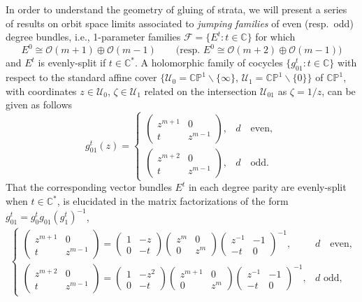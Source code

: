 \documentclass[pdftex]{sigma}
\newcommand{\field}[1]{\ensuremath{\mathbb{#1}}}
\newcommand{\CC}{\field{C}}
\newcommand{\PP}{\field{P}}
\newcommand{\calO}{\mathcal{O}}
\newcommand{\curly}[1]{\mathscr{#1}}
\newcommand{\cF}{\curly{F}}
\newcommand{\cU}{\curly{U}}
\numberwithin{equation}{section}
\begin{document}
In order to understand the geometry of gluing of strata, we will present a series of results on orbit space limits associated to \textit{jumping families} of even (resp.~odd) degree bundles, i.e., 1-parameter families $\cF = \{E^{t}\colon t\in\CC\}$ for which
\[
E^{0}\cong \calO(m+1)\oplus\calO(m-1)\qquad \big(\text{resp. } E^{0}\cong \calO(m+2)\oplus\calO(m-1)\big)
\]
and $E^{t}$ is evenly-split if $t\in\CC^{*}$. A holomorphic family of cocycles $\{g_{01}^{t}\colon t\in\CC\}$ with respect to the standard affine cover $\{\cU_{0}= \CC\PP^{1}\backslash\{\infty\}$, $\cU_{1}= \CC\PP^{1}\backslash\{0\}\}$ of $\CC\PP^{1}$, with coordinates $z\in\cU_{0}$, $\zeta\in\cU_{1}$ related on the intersection $\cU_{01}$ as $\zeta = 1/z$, can be given as follows
\[
g^{t}_{01}(z) = \begin{cases}
\begin{pmatrix}
z^{m+1} & 0\\
t & z^{m-1}
\end{pmatrix}\!, & d\quad \text{even},
\\[3ex]
\begin{pmatrix}
z^{m+2} & 0\\
t & z^{m-1}
\end{pmatrix}\!, & d\quad \text{odd}.
\end{cases}
\]
That the corresponding vector bundles $E^{t}$ in each degree parity are evenly-split when $t\in\CC^{*}$, is elucidated in the matrix factorizations of the form $g^{t}_{01} = g^{t}_{0}g_{01}(g^{t}_{1})^{-1}$,
\begin{gather}\label{eq:cocycle}
 \begin{cases}
\begin{pmatrix}
z^{m+1} & 0\\
t & z^{m-1}
\end{pmatrix} =
\begin{pmatrix}
1 & -z\\
0 & -t
\end{pmatrix}
\begin{pmatrix}
z^{m} & 0\\
0& z^{m}
\end{pmatrix}
\begin{pmatrix}
z^{-1} & -1\\
-t & 0
\end{pmatrix}^{-1}, & d \quad \text{even},
\\[3ex]
\begin{pmatrix}
z^{m+2} & 0\\
t & z^{m-1}
\end{pmatrix} =
\begin{pmatrix}
1 & -z^{2}\\
0 & -t
\end{pmatrix}
\begin{pmatrix}
z^{m+1} & 0\\
0& z^{m}
\end{pmatrix}
\begin{pmatrix}
z^{-1}& -1\\
-t& 0
\end{pmatrix}^{-1}, & d \text{ odd},
\end{cases}
\end{gather}
\end{document}
